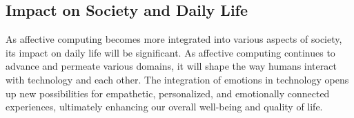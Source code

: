 \subsection{Impact on Society and Daily Life}

As affective computing becomes more integrated into various aspects of society, its impact on daily life will be significant.
As affective computing continues to advance and permeate various domains, it will shape the way humans interact with technology and each other. 
The integration of emotions in technology opens up new possibilities for empathetic, personalized, and emotionally connected experiences, 
ultimately enhancing our overall well-being and quality of life.